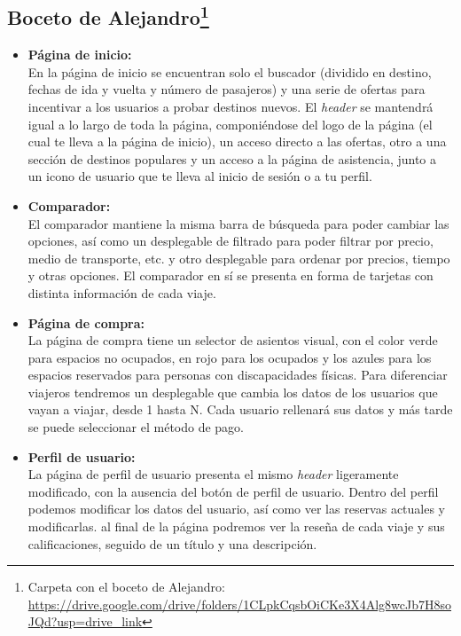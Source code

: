 \subsection[Boceto de Alejandro]{Boceto de Alejandro\footnote{Carpeta con el boceto de Alejandro: \url{https://drive.google.com/drive/folders/1CLpkCqsbOiCKe3X4Alg8wcJb7H8soJQd?usp=drive_link}}}

\begin{itemize}
      \item\textbf{Página de inicio:} \\ En la página de inicio se encuentran solo el buscador (dividido en destino, fechas de ida y vuelta y número de pasajeros) y una serie de ofertas para incentivar a los usuarios a probar destinos nuevos. El \textit{header} se mantendrá igual a lo largo de toda la página, componiéndose del logo de la página (el cual te lleva a la página de inicio), un acceso directo a las ofertas, otro a una sección de destinos populares y un acceso a la página de asistencia, junto a un icono de usuario que te lleva al inicio de sesión o a tu perfil.
      \item\textbf{Comparador:} \\ El comparador mantiene la misma barra de búsqueda para poder cambiar las opciones, así como un desplegable de filtrado para poder filtrar por precio, medio de transporte, etc. y otro desplegable para ordenar por precios, tiempo y otras opciones. El comparador en sí se presenta en forma de tarjetas con distinta información de cada viaje.
      \item\textbf{Página de compra:} \\ La página de compra tiene un selector de asientos visual, con el color verde para espacios no ocupados, en rojo para los ocupados y los azules para los espacios reservados para personas con discapacidades físicas. Para diferenciar viajeros tendremos un desplegable que cambia los datos de los usuarios que vayan a viajar, desde 1 hasta N. Cada usuario rellenará sus datos y más tarde se puede seleccionar el método de pago.
      \item\textbf{Perfil de usuario:} \\ La página de perfil de usuario presenta el mismo \textit{header} ligeramente modificado, con la ausencia del botón de perfil de usuario. Dentro del perfil podemos modificar los datos del usuario, así como ver las reservas actuales y modificarlas. al final de la página podremos ver la reseña de cada viaje y sus calificaciones, seguido de un título y una descripción.
\end{itemize}

